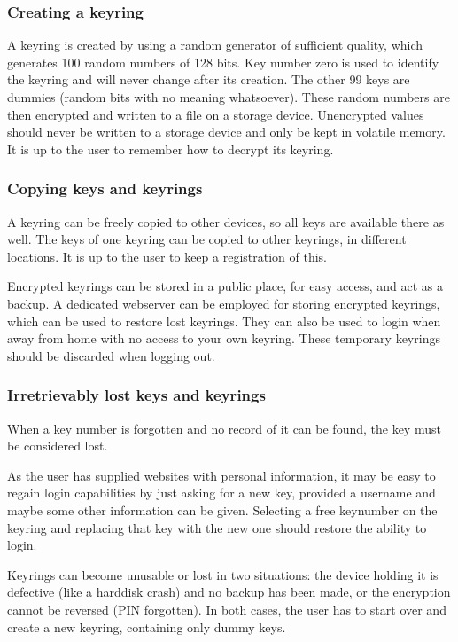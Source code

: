 \subsubsection{Creating a keyring}
A keyring is created by using a random generator of sufficient quality,
which generates 100 random numbers of 128 bits.
Key number zero is used to identify the keyring and will never change after its creation.
The other 99 keys are dummies
(random bits with no meaning whatsoever).
These random numbers are then encrypted and written to a file
on a storage device.
Unencrypted values should never be written to a storage device and only be kept in volatile memory.
It is up to the user to remember how to decrypt its keyring.

\subsubsection{Copying keys and keyrings}
A keyring can be freely copied to other devices, so all keys are available there as well.
The keys of one keyring can be copied to other keyrings, in different locations.
It is up to the user to keep a registration of this.
\par
Encrypted keyrings can be stored in a public place, for easy access, and act as a backup.
A dedicated webserver can be employed for storing encrypted keyrings,
which can be used to restore lost keyrings.
They can also be used to login when away from home with no access to your own keyring.
These temporary keyrings should be discarded when logging out.

\subsubsection{Irretrievably lost keys and keyrings}
When a key number is forgotten and no record of it can be found,
the key must be considered lost.
\par
As the user has supplied websites with personal information,
it may be easy to regain login capabilities by just asking for a new key,
provided a username and maybe some other information can be given.
Selecting a free keynumber on the keyring and replacing that key with the new one should restore the ability to login.
\par
Keyrings can become unusable or lost in two situations:
the device holding it is defective (like a harddisk crash) and no backup has been made,
or the encryption cannot be reversed (PIN forgotten).
In both cases, the user has to start over and create a new keyring, containing only dummy keys.
